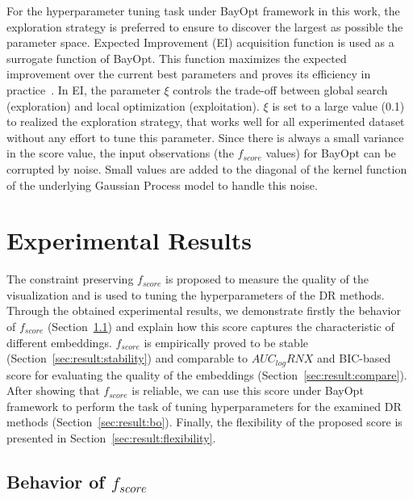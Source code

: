 For the hyperparameter tuning task under BayOpt framework in this work, the exploration strategy is preferred to ensure to discover the largest as possible the parameter space.
Expected Improvement (EI) acquisition function is used as a surrogate function of BayOpt.
This function maximizes the expected improvement over the current best parameters and proves its efficiency in practice~\cite{snoek2012practical}.
In EI, the parameter $\xi$ controls the trade-off between global search (exploration) and local optimization (exploitation).
$\xi$ is set to a large value (0.1) to realized the exploration strategy, that works well for all experimented dataset without any effort to tune this parameter.
Since there is always a small variance in the score value, 
the input observations (the $f_{score}$ values) for BayOpt can be corrupted by noise.
Small values are added to the diagonal of the kernel function of the underlying Gaussian Process model to handle this noise.


\section{Experimental Results}\label{sec:results}

The constraint preserving $f_{score}$ is proposed to measure the quality of the visualization and is used to tuning the hyperparameters of the DR methods.
Through the obtained experimental results, we demonstrate firstly the behavior of $f_{score}$ (Section~\ref{sec:result:fscore}) and explain how this score captures the characteristic of different embeddings.
$f_{score}$ is empirically proved to be stable (Section~\ref{sec:result:stability}) and comparable to $AUC_{log}RNX$ and BIC-based score for evaluating the quality of the embeddings (Section~\ref{sec:result:compare}).
After showing that $f_{score}$ is reliable, we can use this score under BayOpt framework to perform the task of tuning hyperparameters for the examined DR methods (Section~\ref{sec:result:bo}).
Finally, the flexibility of the proposed score is presented in Section~\ref{sec:result:flexibility}.

\subsection{Behavior of $f_{score}$}\label{sec:result:fscore}


